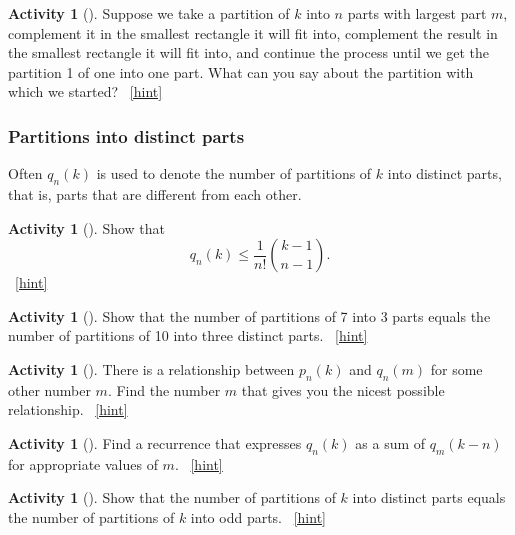 \documentclass[10pt,]{book}
\theoremstyle{plain}
\theoremstyle{definition}
\theoremstyle{definition}
\theoremstyle{definition}
\newtheorem{activity}[project]{Activity}
\numberwithin{equation}{chapter}
\begin{document}
\begin{activity}[]\label{activity-302}
\hypertarget{p-1534}{}%
Suppose we take a partition of \(k\) into \(n\) parts with largest part \(m\), complement it in the smallest rectangle it will fit into, complement the result in the smallest rectangle it will fit into, and continue the process until we get the partition 1 of one into one part.  What can you say about the partition with which we started?%
~\hfill{\tiny\hyperlink{a-309}{[hint]}\hypertarget{q-309}{}}\end{activity}
\typeout{************************************************}
\typeout{************************************************}
\subsubsection[{Partitions into distinct parts}]{Partitions into distinct parts}\label{subsubsection-1}
\hypertarget{p-1541}{}%
Often \(q_n(k)\) is used to denote the number of partitions of \(k\) into distinct parts, that is, parts that are different from each other.%
\begin{activity}[]\label{activity-303}
\hypertarget{p-1542}{}%
Show that%
\begin{equation*}
q_n(k) \le \frac{1}{n!}\binom{k-1}{n-1}.
\end{equation*}
%
~\hfill{\tiny\hyperlink{a-310}{[hint]}\hypertarget{q-310}{}}\end{activity}
\begin{activity}[]\label{activity-304}
\hypertarget{p-1545}{}%
Show that the number of partitions of 7 into 3 parts equals the number of partitions of 10 into three distinct parts.%
~\hfill{\tiny\hyperlink{a-311}{[hint]}\hypertarget{q-311}{}}\end{activity}
\begin{activity}[]\label{activity-305}
\hypertarget{p-1548}{}%
There is a relationship between \(p_n(k)\) and \(q_n(m)\) for some other number \(m\). Find the number \(m\) that gives you the nicest possible relationship.%
~\hfill{\tiny\hyperlink{a-312}{[hint]}\hypertarget{q-312}{}}\end{activity}
\begin{activity}[]\label{activity-306}
\hypertarget{p-1551}{}%
Find a recurrence that expresses \(q_n(k)\) as a sum of \(q_m(k-n)\) for appropriate values of \(m\).%
~\hfill{\tiny\hyperlink{a-313}{[hint]}\hypertarget{q-313}{}}\end{activity}
\begin{activity}[]\label{activity-307}
\hypertarget{p-1554}{}%
Show that the number of partitions of \(k\) into distinct parts equals the number of partitions of \(k\) into odd parts.%
~\hfill{\tiny\hyperlink{a-314}{[hint]}\hypertarget{q-314}{}}\end{activity}
\end{document}
